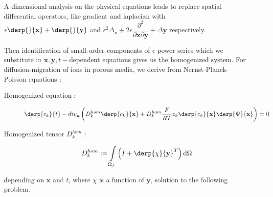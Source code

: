 \par
A dimensional analysis on the physical equations leads to replace spatial differential operators, like gradient and laplacian with %
$\epsilon\derp{}{\mathbf{x}}+\derp{}{\mathbf{y}}$ and $\epsilon^2\Delta_{\mathbf{x}}+2\epsilon \dfrac{\partial^2}{\partial{\mathbf{x}}\partial{\mathbf{y}}} +\Delta{\mathbf{y}}$ respectively.

\par
Then identification of small-order components of $\epsilon$ power series which we substitute in $\mathbf{x},\mathbf{y},t-$dependent equations gives us the homogenized system. %
For diffusion-migration of ions in porous media, we derive from Nernst-Planck-Poisson equations :

\begin{description}
\item[Homogenized equation :] %
\[\derp{c_k}{t}-div_{\mathbf{x}}\left(D_k^{hom}\derp{c_k}{\mathbf{x}}+D_k^{hom}\frac{F}{RT}z_k \derp{c_k}{\mathbf{x}}\derp{\Psi}{\mathbf{x}}\right)=0\]
\item[Homogenized tensor $D_k^{hom}$ :] 
\[D_k^{hom}:=\int\limits_{\Omega_f}\left(I+\derp{\chi}{\mathbf{y}}^T\right)\text{d}\Omega\]
\end{description}

depending on $\mathbf{x}$ and $t$, %
where $\chi$ is a function of $\mathbf{y}$, %
solution to the following problem.

\begin{comment}
\begin{rema}
In this paragraph we have skipped adimensionalization of the physical equations, which is prior to asymptotical analysis. %
Anyway, if doesn't change the general idea of the proof.
\end{rema}
\end{comment}

